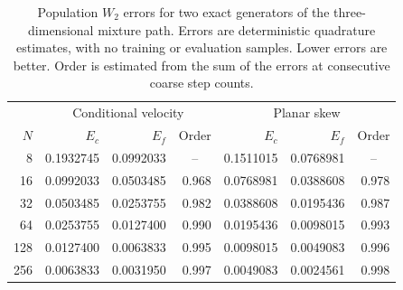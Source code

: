 \begin{table}[t]
\centering
\caption{Population $W_2$ errors for two exact generators of the three-dimensional mixture path. Errors are deterministic quadrature estimates, with no training or evaluation samples. Lower errors are better. Order is estimated from the sum of the errors at consecutive coarse step counts.}
\label{tab:population-example}
\small
\begin{tabular}{@{}r rrr rrr@{}}
\toprule
& \multicolumn{3}{c}{Conditional velocity} & \multicolumn{3}{c}{Planar skew}\\
$N$ & $E_c$ & $E_f$ & Order & $E_c$ & $E_f$ & Order\\
\midrule
8 & 0.1932745 & 0.0992033 & \multicolumn{1}{c}{--} & 0.1511015 & 0.0768981 & \multicolumn{1}{c}{--}\\
16 & 0.0992033 & 0.0503485 & 0.968 & 0.0768981 & 0.0388608 & 0.978\\
32 & 0.0503485 & 0.0253755 & 0.982 & 0.0388608 & 0.0195436 & 0.987\\
64 & 0.0253755 & 0.0127400 & 0.990 & 0.0195436 & 0.0098015 & 0.993\\
128 & 0.0127400 & 0.0063833 & 0.995 & 0.0098015 & 0.0049083 & 0.996\\
256 & 0.0063833 & 0.0031950 & 0.997 & 0.0049083 & 0.0024561 & 0.998\\
\bottomrule
\end{tabular}
\end{table}
